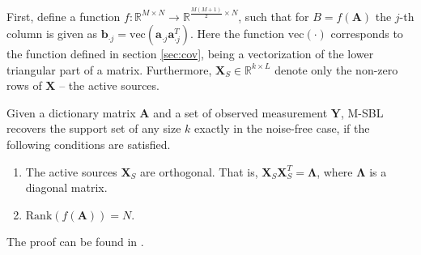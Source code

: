 First, define a function $f : \mathbb{R}^{M \times N} \rightarrow \mathbb{R}^{\frac{M(M+1)}{2}\times N}$, such that for $B = f(\mathbf{A})$ the $j$-th column is given as $\mathbf{b}_{\cdot j} = \text{vec}(\mathbf{a}_{\cdot j}\mathbf{a}_{\cdot j}^T)$. 
Here the function $\text{vec}(\cdot)$ corresponds to the function defined in section \ref{sec:cov}, being a vectorization of the lower triangular part of a matrix. 
Furthermore, $\mathbf{X}_S \in \mathbb{R}^{k \times L}$ denote only the non-zero rows of $\mathbf{X}$ -- the active sources.  
\begin{theorem}
Given a dictionary matrix $\mathbf{A}$ and a set of observed measurement $\mathbf{Y}$, M-SBL recovers the support set of any size $k$ exactly in the noise-free case, if the following conditions are satisfied. 
\begin{enumerate}
\item The active sources $\mathbf{X}_S$ are orthogonal. That is, $\mathbf{X}_S \mathbf{X}_S^T = \boldsymbol{\Lambda}$, where $\boldsymbol{\Lambda}$ is a diagonal matrix.
\item $\text{Rank}(f(\mathbf{A}))= N$.
\end{enumerate}
The proof can be found in \cite[p. 16]{Balkan2014}.
\label{th:conditions}
\end{theorem}  

